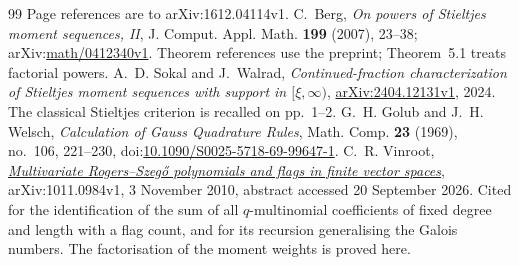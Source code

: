 \documentclass[11pt]{article}
\begin{document}
\begin{thebibliography}{99}
  Page references are to arXiv:1612.04114v1.
 C.~Berg, \emph{On powers of Stieltjes moment sequences, II},
  J. Comput. Appl. Math. \textbf{199} (2007), 23--38;
  arXiv:\href{https://arxiv.org/abs/math/0412340v1}{math/0412340v1}.
  Theorem references use the preprint; Theorem~5.1 treats factorial powers.
 A.~D. Sokal and J.~Walrad,
  \emph{Continued-fraction characterization of Stieltjes moment sequences
  with support in $[\xi,\infty)$},
  \href{https://arxiv.org/abs/2404.12131v1}{arXiv:2404.12131v1}, 2024.
  The classical Stieltjes criterion is recalled on pp.~1--2.
 G.~H. Golub and J.~H. Welsch,
  \emph{Calculation of Gauss Quadrature Rules}, Math. Comp. \textbf{23}
  (1969), no.~106, 221--230,
  doi:\href{https://doi.org/10.1090/S0025-5718-69-99647-1}{10.1090/S0025-5718-69-99647-1}.
 C.~R. Vinroot,
  \href{https://arxiv.org/abs/1011.0984}{\emph{Multivariate Rogers--Szeg\H{o}
  polynomials and flags in finite vector spaces}}, arXiv:1011.0984v1,
  3 November 2010, abstract accessed 20 September 2026.  Cited for the
  identification of the sum of all $q$-multinomial coefficients of fixed
  degree and length with a flag count, and for its recursion generalising the
  Galois numbers.  The factorisation of the moment weights is proved here.
\end{thebibliography}
\end{document}
